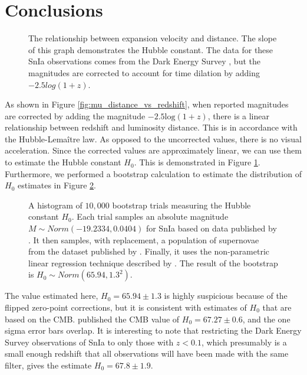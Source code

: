 \documentclass[linenumbers]{aastex631}
\begin{document}
\section{Conclusions}
\label{sec:conclusions}

\begin{figure}
  \caption{The relationship between expansion velocity and distance. The slope
  of this graph demonstrates the Hubble constant. The data for these SnIa
  observations comes from the Dark Energy Survey \citep{vincenzi2024}, but the
  magnitudes are corrected to account for time dilation by adding
  $-2.5 log(1 + z)$.
  }
\label{fig:expansion}
\end{figure}

As shown in Figure \ref{fig:mu_distance_vs_redshift}, when reported magnitudes
are corrected by adding the magnitude $-2.5\text{log}(1+z)$, there is a linear
relationship between redshift and luminosity distance. This is in accordance
with the Hubble-Lema\^{i}tre law. As opposed to the uncorrected values, there
is no visual acceleration. Since the corrected values are approximately linear,
we can use them to estimate the Hubble constant $H_0$. This is demonstrated in
Figure \ref{fig:expansion}. Furthermore, we performed a bootstrap calculation
to estimate the distribution of $H_0$ estimates in Figure
\ref{fig:H0bootstrap}.

\begin{figure}
  \caption{A histogram of $10{,}000$ bootstrap trials measuring the Hubble constant
  $H_0$. Each trial samples an absolute magnitude $M \sim Norm(-19.2334,
  0.0404)$ for SnIa based on data published by \citet{camarena2020}. It then samples,
  with replacement, a population of supernovae from the dataset published by
  \citet{abbott2024}. Finally, it uses the non-parametric linear regression
  technique described by \citet{siegel1982}. The result of the bootstrap is $H_0
  \sim Norm(65.94, 1.3^2)$.
  }
\label{fig:H0bootstrap}
\end{figure}

The value estimated here, $H_0 = 65.94 \pm 1.3$ is highly suspicious
because of the flipped zero-point corrections, but it is consistent with
estimates of $H_0$ that are based on the CMB. \citet{planck2020} published the
CMB value of $H_0 = 67.27 \pm 0.6$, and the one sigma error bars overlap. It
is interesting to note that restricting the Dark Energy Survey observations of
SnIa \citep{vincenzi2024} to only those with $z < 0.1$, which presumably is a
small enough redshift that all observations will have been made with the same
filter, gives the estimate $H_0 = 67.8 \pm 1.9$.
\end{document}
